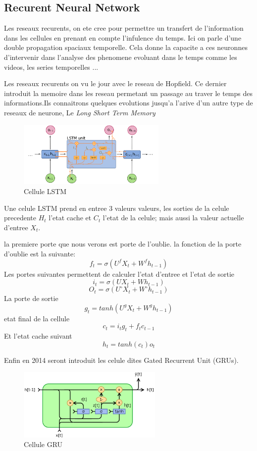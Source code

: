 \documentclass[twoside,twocolumn]{article}
\begin{document}
\subsection{Recurent Neural Network}
Les reseaux recurents, on ete cree pour permettre un transfert de l'information dans les cellules en prenant en compte l'infulence du temps. 
Ici on parle d'une double propagation spaciaux temporelle. Cela donne la capacite a ces neuronnes d'intervenir dans l'analyse des phenomene evoluant dans le temps comme les videos, les series temporelles ...

Les reseaux recurents on vu le jour avec le reseau de Hopfield\cite{Hopfield}. Ce dernier introduit la memoire dans les reseau permetant un passage au traver le temps des informations.Ils connaitrons quelques evolutions jusqu'a l'arive d'un autre type 
de reseaux de neurone, Le \textit{Long Short Term Memory}\cite{lstm1}

\begin{figure}[h]
  \centering
  \includegraphics[width=72mm]{Long_Short-Term_Memory.png}
  \caption{Cellule LSTM}
  \label{lstm}
\end{figure}

Une celule LSTM prend en entree 3 valeurs valeurs, les sorties de la celule precedente $H_t$ l'etat cache et $C_t$ l'etat de la celule; mais aussi la valeur actuelle d'entree $X_t$. 

la premiere porte que nous verons est porte de l'oublie. la fonction de la porte d'oublie est la suivante:
\[f_t = \sigma(U^fX_t + W^fh_{t-1})\]
Les portes suivantes permettent de calculer l'etat d'entree et l'etat de sortie
\[i_t = \sigma(UX_t + Wh_{t-1})\]
\[O_t = \sigma(U^{\circ}X_t + W^{\circ}h_{t-1})\]
La porte de sortie
\[g_t = tanh(U^gX_t + W^gh_{t-1})\]
etat final de la cellule
\[c_t = i_tg_t + f_tc_{t-1}\]
Et l'etat cache suivant
\[h_t = tanh(c_t)o_t\]

Enfin en 2014 seront introduit les celule dites Gated Recurrent Unit (GRUs)\cite{cho2014learning}. 

\begin{figure}[h]
  \centering
  \includegraphics[width=70mm]{GRU.png}
  \caption{Cellule GRU}
  \label{GRUs}
\end{figure}
\end{document}

